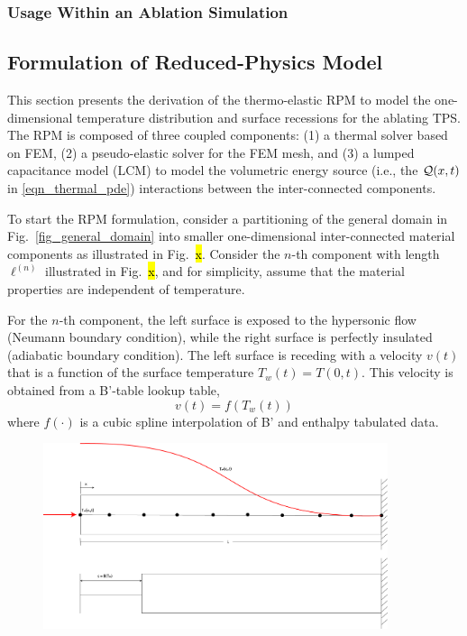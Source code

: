 \subsubsection{Usage Within an Ablation Simulation}


\subsection{Formulation of Reduced-Physics Model}

This section presents the derivation of the thermo-elastic RPM to model the one-dimensional temperature distribution and surface recessions for the ablating TPS. The RPM is composed of three coupled components: (1) a thermal solver based on FEM, (2) a pseudo-elastic solver for the FEM mesh, and (3) a lumped capacitance model (LCM) to model the volumetric energy source (i.e., the $\mathcal{Q}(x,t)$ in \cref{eqn_thermal_pde}) interactions between the inter-connected components.

To start the RPM formulation, consider a partitioning of the general domain in Fig.~\ref{fig_general_domain} into smaller one-dimensional inter-connected material components as illustrated in Fig.~\hl{x}. Consider the $n$-th component with length $\ell^{(n)}$ illustrated in Fig.~\hl{x}, and for simplicity, assume that the material properties are independent of temperature.

For the $n$-th component, the left surface is exposed to the hypersonic flow (Neumann boundary condition), while the right surface is perfectly insulated (adiabatic boundary condition). The left surface is receding with a velocity $v(t)$ that is a function of the surface temperature $T_w(t)=T(0,t)$. This velocity is obtained from a B'-table lookup table,
\[
    v(t) = f(T_w(t))
\]
where $f(\cdot)$ is a cubic spline interpolation of B' and enthalpy tabulated data.

\begin{figure}[h]
    \centering
    \includegraphics[width=0.9\textwidth]{./figs/ablation.png}
    \label{fig_ablation_domain}
\end{figure}

